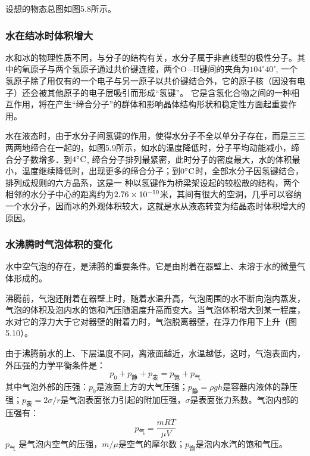 设想的物态总图如图5.8所示。
\begin{figure}[htp]
  \centering
  \caption{}
\end{figure}

\subsubsection{水在结冰时体积增大}

水和冰的物理性质不同，与分子的结构有关，水分子属于非直线型的极性分子。其中的氧原子与两个氢原子通过共价键连接，两个O$-$H键间的夹角为$104^{\circ}40'$, 一个氢原子除了用仅有的一个电子与另一原子以共价键结合外，它的原子核（因没有电子）还会被其他原子的电子层吸引而形成“氢键”。 它是含氢化合物之间的一种相互作用，将在产生“缔合分子”的群体和影响晶体结构形状和稳定性方面起重要作用。
\begin{figure}[htp]
  \centering
  \caption{}
\end{figure}

水在液态时，由于水分子间氢键的作用，使得水分子不全以单分子存在，而是三三两两地缔合在一起的，如图5.9所示，如水的温度降低时，分子平均动能减小，缔合分子数增多．到$4^{\circ}{\rm C}$, 缔合分子排列最紧密，此时分子的密度最大，水的体积最小，温度继续降低时，出现更多的缔合分子；到$0^{\circ}{\rm C}$时，全部水分子因氢键结合，排列成规则的六方晶系，这是一
种以氢键作为桥梁架设起的较松散的结构，两个相邻的水分子中心的距离约为$2. 76\times10^{-10}$米，其间有很大的空洞，几乎可以容纳一个水分子，因而冰的外观体积较大，这就是水从液态转变为结晶态时体积增大的原因。


\subsubsection{水沸腾时气泡体积的变化}

水中空气泡的存在，是沸腾的重要条件。它是由附着在器壁上、未溶于水的微量气体形成的。

沸腾前，气泡还附着在器壁上时，随着水温升高，气泡周围的水不断向泡内蒸发，气泡的体积及泡内水的饱和汽压随温度升高而变大。当气泡体积增大到某一程度，水对它的浮力大于它对器壁的附着力时，气泡脱离器壁，在浮力作用下上升（图5.10）。
\begin{figure}[htp]
  \centering
  \caption{}
\end{figure}

由于沸腾前水的上、下层温度不同，离液面越近，水温越低，这时，气泡表面内，外压强的力学平衡条件是：
\begin{equation}
  p_0+p_{\text{静}}+p_{\text{表}}=p_{\text{饱}}+p_{\text{气}}
\end{equation}
其中气泡外部的压强：$p_0$是液面上方的大气压强；$p_{\text{静}}=\rho gh$是容器内液体的静压强；$p_{\text{表}}=2\sigma/r$是气泡表面张力引起的附加压强，$\sigma$是表面张力系数。气泡内部的压强有：
\[p_{\text{气}}=\frac{mRT}{\mu V}\]
$p_{\text{气}}$
是气泡内空气的压强，$m/\mu$是空气的摩尔数；$p_{\text{饱}}$是泡内水汽的饱和气压。







